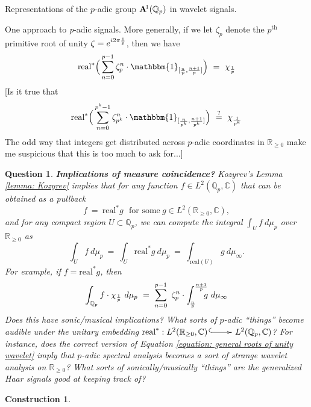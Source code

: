 \documentclass[letterpaper,11pt, reqno]{amsart}
\makeatletter
\newtheorem{monodromy theorem}{Monodromy Theorem}[subsection]
\newtheorem{wild conjecture}[theorem]{Wild Conjecture}
\newtheorem{research objectives}{Research objectives}[subsection]
\newtheorem{question}[theorem]{Question}
\newtheorem{research question}[theorem]{Research questions}
\newtheorem{aside question}[theorem]{Aside question}
\newtheorem{construction}[theorem]{Construction}
\newtheorem{audio example}[theorem]{\loudspeaker[3] Example}
\newtheorem{blank remark}[theorem]{}
\newtheorem{terminology and comment}[theorem]{Terminology and comment}
\newtheorem{purity hypothesis}[theorem]{Purity hypothesis}
\newtheorem{corollary of the purity hypothesis}[theorem]{Corollary of the purity hypothesis}
\newcommand{\CC} {{\mathbb C}}
\newcommand{\QQ} {{\mathbb Q}}
\newcommand{\RR} {{\mathbb R}}
\newcommand{\mono}{\!\xymatrix{{}\ar@{^{(}->}[r]&{}}\!}
\numberwithin{equation}{theorem}
\makeatother
\begin{document}
\begin{section}{Representations of the $p$-adic group $\bold{A}^{\!1}(\mathbb{Q}_{p})$ in wavelet signals.}
\begin{subsection}{One approach to {\em p}-adic signals.}
More generally, if we let $\zeta_p$ denote the $p^\text{th}$ primitive root of unity $\zeta=e^{i2\pi\text{{\smaller\smaller\smaller$\tfrac{1}{p}$}}}$, then we have
	$$
	\text{real}^\ast\Big(\sum_{n=0}^{p-1}\zeta^{n}_p\cdot\mathbbm{1}_{[\text{{\smaller\smaller\smaller $\tfrac{n}{p}$}},\text{{\smaller\smaller\smaller $\tfrac{n+1}{p}$}}]}\Big)
	\ =\ 
	\chi_{\text{{\smaller\smaller\smaller $\tfrac{1}{p}$}}}
	$$
{\color{red} [Is it true that
	\begin{equation}\label{equation: general roots of unity wavelet}
	\text{real}^\ast\Big(\sum_{n=0}^{p^{k}-1}\zeta^{n}_{p^k}\cdot\mathbbm{1}_{[\text{{\smaller\smaller\smaller $\tfrac{n}{p^k}$}},\text{{\smaller\smaller\smaller $\tfrac{n+1}{p^k}$}}]}\Big)
	\ \overset{?}{=}\ 
	\chi_{\text{{\smaller\smaller\smaller $\tfrac{1}{p^k}$}}}
	\end{equation}
The odd way that integers get distributed across $p$-adic coordinates in $\RR_{\ge 0}$ make me suspicious that this is too much to ask for...]}

\begin{question}
{\bf Implications of measure coincidence?}
\normalfont
Kozyrev's Lemma \ref{lemma: Kozyrev} implies that for any function $f\in L^{2}(\QQ_{p}, \CC)$ that can be obtained as a pullback
	$$
	f\ =\ \text{real}^\ast g
	\ \ \ \text{for some}\ g\in L^2(\RR_{\ge0},\CC),
	$$
and for any compact region $U\subset \QQ_{p}$, we can compute the integral $\int_{U}f\ d\mu_p$ over $\RR_{\ge0}$ as
	$$
	\int_{U}f\ d\mu_p
	\ =\ 
	\int_{U}\text{real}^{\ast}\!g\  d\mu_{p}
	\ =\ 
	\int_{\text{real}(U)}g\ d\mu_{\infty}.
	$$
For example, if $f=\text{real}^\ast g$, then
	$$
	\int_{\QQ_{p}}f\cdot\chi_{\text{{\smaller\smaller\smaller $\tfrac{1}{p}$}}}\ d\mu_p
	\ =\ 
	\sum_{n=0}^{p-1}\ \zeta^{n}_p\cdot\int^{\text{{\smaller\smaller\smaller $\tfrac{n+1}{p}$}}}_{\!\text{{\smaller\smaller\smaller $\tfrac{n}{p}$}}}
	\!\!\!\!g\ d\mu_\infty
	$$
Does this have sonic/musical implications? What sorts of $p$-adic ``things'' become audible under the unitary embedding $\text{real}^\ast:L^2(\RR_{\ge0},\CC)\mono L^2(\QQ_{p},\CC)$? For instance, does the correct version of Equation \eqref{equation: general roots of unity wavelet} imply that $p$-adic spectral analysis becomes a sort of strange wavelet analysis on $\RR_{\ge0}$? What sorts of sonically/musically ``things'' are the {\em generalized} Haar signals good at keeping track of?
\end{question}

\begin{construction}
	\normalfont


\end{construction}
\end{subsection}
\end{section}
\end{document}
